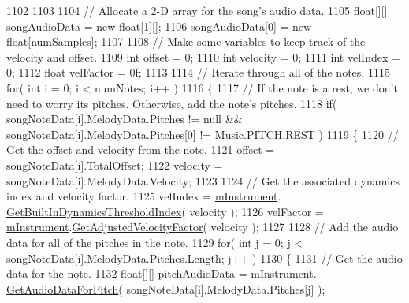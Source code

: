 \begin{DoxyCode}
1102 
1103 
1104         \textcolor{comment}{// Allocate a 2-D array for the song's audio data.}
1105         \textcolor{keywordtype}{float}[][] songAudioData = \textcolor{keyword}{new} \textcolor{keywordtype}{float}[1][];
1106         songAudioData[0] = \textcolor{keyword}{new} \textcolor{keywordtype}{float}[numSamples];
1107 
1108         \textcolor{comment}{// Make some variables to keep track of the velocity and offset.}
1109         \textcolor{keywordtype}{int} offset = 0;
1110         \textcolor{keywordtype}{int} velocity = 0;
1111         \textcolor{keywordtype}{int} velIndex = 0;
1112         \textcolor{keywordtype}{float} velFactor = 0f;
1113 
1114         \textcolor{comment}{// Iterate through all of the notes.}
1115         \textcolor{keywordflow}{for}( \textcolor{keywordtype}{int} i = 0; i < numNotes; i++ )
1116         \{
1117             \textcolor{comment}{// If the note is a rest, we don't need to worry its pitches. Otherwise, add the note's
       pitches.}
1118             \textcolor{keywordflow}{if}( songNoteData[i].MelodyData.Pitches != null && songNoteData[i].MelodyData.Pitches[0] != 
      \hyperlink{class_music}{Music}.\hyperlink{group___music_enums_ga508f69b199ea518f935486c990edac1d}{PITCH}.REST )
1119             \{
1120                 \textcolor{comment}{// Get the offset and velocity from the note.}
1121                 offset = songNoteData[i].TotalOffset;
1122                 velocity = songNoteData[i].MelodyData.Velocity;
1123 
1124                 \textcolor{comment}{// Get the associated dynamics index and velocity factor.}
1125                 velIndex = \hyperlink{group___v_i_m_priv_gaed435d1f9be09864846db4322dc21fd1}{mInstrument}.
      \hyperlink{group___v_i_base_pub_func_gacddf07c08c3a8154a6934be22f539788}{GetBuiltInDynamicsThresholdIndex}( velocity );
1126                 velFactor = \hyperlink{group___v_i_m_priv_gaed435d1f9be09864846db4322dc21fd1}{mInstrument}.\hyperlink{group___v_i_base_pub_func_gae638c68bd0e79d0b99495be69e50f49d}{GetAdjustedVelocityFactor}( 
      velocity );
1127 
1128                 \textcolor{comment}{// Add the audio data for all of the pitches in the note.}
1129                 \textcolor{keywordflow}{for}( \textcolor{keywordtype}{int} j = 0; j < songNoteData[i].MelodyData.Pitches.Length; j++ )
1130                 \{
1131                     \textcolor{comment}{// Get the audio data for the note.}
1132                     \textcolor{keywordtype}{float}[][] pitchAudioData = \hyperlink{group___v_i_m_priv_gaed435d1f9be09864846db4322dc21fd1}{mInstrument}.
      \hyperlink{group___v_i_base_pub_func_gaf715f7c3bbd2f1a2fa543b2f0684f8a6}{GetAudioDataForPitch}( songNoteData[i].MelodyData.Pitches[j] );

\end{DoxyCode}
